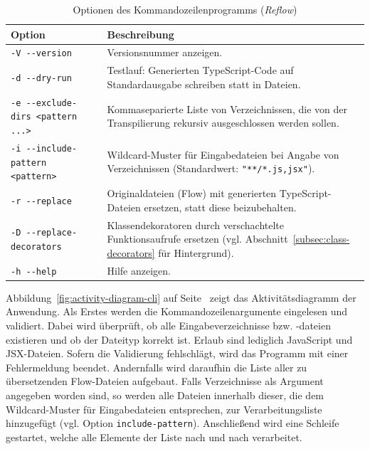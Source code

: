 \bigskip
\begin{table}[tbh]
  \small
  \begin{tabularx}{\textwidth}{@{}lX@{}}
    \midrule
    \textbf{Option} & \textbf{Beschreibung} \\
    \midrule
    \smallskip
    \texttt{-V -{}-version} & Versionsnummer anzeigen. \\
    \smallskip
    \texttt{-d -{}-dry-run} & Testlauf: Generierten TypeScript-Code auf Standardausgabe schreiben statt in Dateien.\\
    \smallskip
    \texttt{-e -{}-exclude-dirs <pattern ...>} & Kommaseparierte Liste von Verzeichnissen, die von der Transpilierung rekursiv ausgeschlossen werden sollen. \\
    \smallskip
    \texttt{-i -{}-include-pattern <pattern>} & Wildcard-Muster für Eingabedateien bei Angabe von Verzeichnissen (Standardwert: \texttt{"**/*.{js,jsx}"}). \\
    \smallskip
    \texttt{-r -{}-replace} & Originaldateien (Flow) mit generierten TypeScript-Dateien ersetzen, statt diese beizubehalten. \\
    \smallskip
    \texttt{-D -{}-replace-decorators} & Klassendekoratoren durch verschachtelte Funktionsaufrufe ersetzen (vgl. Abschnitt~\ref{subsec:class-decorators} für Hintergrund). \\
    \smallskip
    \texttt{-h -{}-help} & Hilfe anzeigen. \\
    \midrule
  \end{tabularx}
  \caption{Optionen des Kommandozeilenprogramms (\textit{Reflow})}
  \label{tab:cli-options}
\end{table}

Abbildung~\ref{fig:activity-diagram-cli} auf Seite~\pageref{fig:activity-diagram-cli} zeigt das Aktivitätsdiagramm der Anwendung. Als Erstes werden die Kommandozeilenargumente eingelesen und validiert. Dabei wird überprüft, ob alle Eingabeverzeichnisse bzw. -dateien existieren und ob der Dateityp korrekt ist. Erlaub sind lediglich JavaScript und JSX-Dateien. Sofern die Validierung fehlschlägt, wird das Programm mit einer Fehlermeldung beendet.
Andernfalls wird daraufhin die Liste aller zu übersetzenden Flow-Dateien aufgebaut. Falls Verzeichnisse als Argument angegeben worden sind, so werden alle Dateien innerhalb dieser, die dem Wildcard-Muster für Eingabedateien entsprechen, zur Verarbeitungsliste hinzugefügt (vgl. Option \texttt{include-pattern}).
Anschließend wird eine Schleife gestartet, welche alle Elemente der Liste nach und nach verarbeitet.

